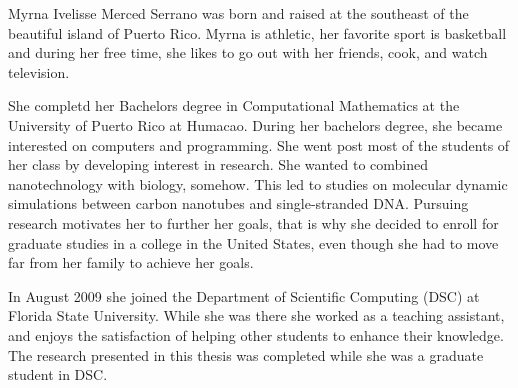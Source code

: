 \documentclass[11pt]{fsuthesis}
\begin{document}
\appendix



%





\begin{biosketch}
Myrna Ivelisse Merced Serrano was born and raised at the southeast of the beautiful island of Puerto Rico. Myrna is athletic, her favorite sport is basketball and during her free time, she likes to go out with her friends, cook, and watch television. 

She completd her Bachelors degree in Computational Mathematics at the University of Puerto Rico at Humacao. During her bachelors degree, she became interested on computers and programming. She went post most of the students of her class by developing interest in research. She wanted to combined nanotechnology with biology, somehow. This led to studies on molecular dynamic simulations between carbon nanotubes and single-stranded DNA. Pursuing research motivates her to further her goals, that is why she decided to enroll for graduate studies in a college in the United States, even though she had to move far from her family to achieve her goals.

In August 2009 she joined the Department of Scientific Computing (DSC) at Florida State University. While she was there she worked as a teaching assistant, and enjoys the satisfaction of helping other students to enhance their knowledge. 
The research presented in this thesis was completed while she was a graduate student in DSC.
\end{biosketch}
\end{document}
